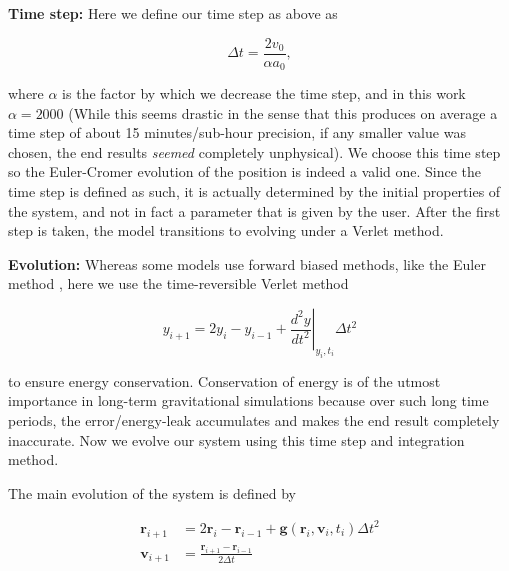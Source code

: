 \documentclass{report}
\begin{document}
            \textbf{Time step:} Here we define our time step as above as
            
            \begin{equation} \label{eq:time-step}
                \Delta t = \frac{2 v_0}{\alpha a_0},
            \end{equation}
            
            where $\alpha$ is the factor by which we decrease the time step, and in this work $\alpha = 2000$ (While this seems drastic in the sense that this produces on average a time step of about 15 minutes/sub-hour precision, if any smaller value was chosen, the end results \emph{seemed} completely unphysical).  We choose this time step so the Euler-Cromer evolution of the position is indeed a valid one.  Since the time step is defined as such, it is actually determined by the initial properties of the system, and not in fact a parameter that is given by the user.  After the first step is taken, the model transitions to evolving under a Verlet method.
            
            \textbf{Evolution:} Whereas some models use forward biased methods, like the Euler method \cite{korber2018primer}, here we use the time-reversible Verlet method
            
            \begin{equation} \label{eq:verlet}
                y_{i + 1} = 2 y_i - y_{i - 1} + \left. \frac{d^2 y}{d t^2} \right|_{y_i, t_i} \Delta t^2
            \end{equation}
            
            to ensure energy conservation.  Conservation of energy is of the utmost importance in long-term gravitational simulations because over such long time periods, the error/energy-leak accumulates and makes the end result completely inaccurate.  Now we evolve our system using this time step and integration method.

\pagebreak

            The main evolution of the system is defined by
            
            \begin{subequations} \label{eq:step}
                \begin{align}
                    \mathbf{r}_{i + 1} &= 2 \mathbf{r}_i - \mathbf{r}_{i - 1} + \mathbf{g}(\mathbf{r}_i, \mathbf{v}_i, t_i) \Delta t^2 \\
                    \mathbf{v}_{i + 1} &= \frac{\mathbf{r}_{i + 1} - \mathbf{r}_{i - 1}}{2 \Delta t}
                \end{align}
            \end{subequations}
            
\end{document}
